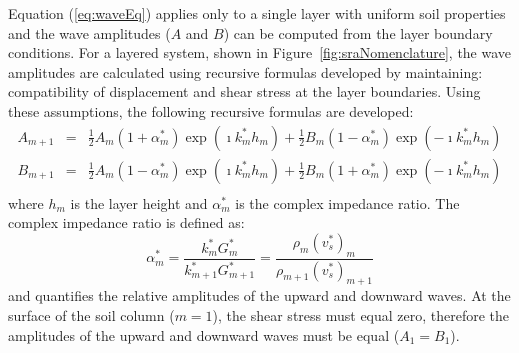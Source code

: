 \documentclass[11pt]{report}
\begin{document}
Equation (\ref{eq:waveEq}) applies only to a single layer with uniform soil properties and the
wave amplitudes ($A$ and $B$) can be computed from the layer boundary conditions.  For a layered
system, shown in Figure~\ref{fig:sraNomenclature}, the wave amplitudes are calculated using
recursive formulas developed by maintaining: compatibility of displacement and shear stress at the
layer boundaries.  Using these assumptions, the following recursive formulas are developed:
\begin{equation}
  \begin{array}{rcl}
	A_{m+1} & = & \frac{1}{2} A_m \left( 1 + \alpha_m^* \right) \exp\left(\imath k_m^* h_m \right) +
		\frac{1}{2} B_m \left( 1 - \alpha_m^* \right) \exp\left(-\imath k_m^* h_m \right)\\
	B_{m+1} & = & \frac{1}{2} A_m \left( 1 - \alpha_m^* \right) \exp\left(\imath k_m^* h_m\right) +
		\frac{1}{2} B_m \left( 1 + \alpha_m^* \right) \exp\left(-\imath k_m^* h_m \right)\\
  \end{array}
\end{equation}
where $h_m$ is the layer height and $\alpha_m^*$ is the complex impedance ratio.  The complex
impedance ratio is defined as:
\begin{equation}
  \alpha_m^* = \frac{k_m^* G_m^*}{k_{m+1}^* G_{m+1}^*} = \frac{\rho_m ( v_s^* )_m }{\rho_{m+1} (
  v_s^* )_{m+1} } 
\end{equation}
and quantifies the relative amplitudes of the upward and downward waves.  At the surface of the soil
column ($m=1$), the shear stress must equal zero, therefore the amplitudes of the upward and
downward waves must be equal ($A_1=B_1$).  
\end{document}
